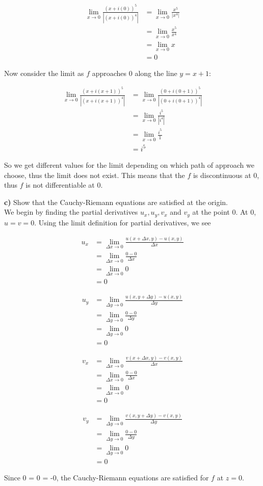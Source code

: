 \documentclass{scrartcl}
\begin{document}
\begin{align*}
\lim_{x\rightarrow0}\frac{(x+i(0))^5}{|(x+i(0))^4|} &= \lim_{x\rightarrow0}\frac{x^5}{|x^4|}\\
  &= \lim_{x\rightarrow0}\frac{x^5}{x^4}\\
  &= \lim_{x\rightarrow0}x\\
  &= 0
\end{align*}

Now consider the limit as $f$ approaches $0$ along the line $y=x+1$:

\begin{align*}
  \lim_{x\rightarrow0}\frac{(x+i(x+1))^5}{|(x+i(x+1))^4|} &= \lim_{x\rightarrow0}\frac{(0+i(0+1))^5}{|(0+i(0+1))^4|}\\
  &= \lim_{x\rightarrow0}\frac{i^5}{|i^4|}\\
  &= \lim_{x\rightarrow0}\frac{i^5}{1}\\
  &= i^5
\end{align*}

So we get different values for the limit depending on which path of approach we choose, thus the limit does not exist. This means that the $f$ is discontinuous at 0, thus $f$ is not differentiable at 0.\pagebreak

\textbf{   c)} Show that the Cauchy-Riemann equations are satisfied at the origin.\\

We begin by finding the partial derivatives $u_x, u_y, v_x$ and $v_y$ at the point 0. At 0, $u = v = 0$. Using the limit definition for partial derivatives, we see

\begin{align*}
  u_x &= \lim_{\Delta x\rightarrow0}\frac{u(x+\Delta x,y) - u(x,y)}{\Delta x}\\
  &= \lim_{\Delta x\rightarrow0}\frac{0 - 0}{\Delta x}\\
  &= \lim_{\Delta x\rightarrow0}0\\
  &= 0
\end{align*}

\begin{align*}
  u_y &= \lim_{\Delta y\rightarrow0}\frac{u(x,y+\Delta y) - u(x,y)}{\Delta y}\\
  &= \lim_{\Delta y\rightarrow0}\frac{0 - 0}{\Delta y}\\
  &= \lim_{\Delta y\rightarrow0}0\\
  &= 0
\end{align*}

\begin{align*}
  v_x &= \lim_{\Delta x\rightarrow0}\frac{v(x+\Delta x,y) - v(x,y)}{\Delta x}\\
  &= \lim_{\Delta x\rightarrow0}\frac{0 - 0}{\Delta x}\\
  &= \lim_{\Delta x\rightarrow0}0\\
  &= 0
\end{align*}

\begin{align*}
 v_y &= \lim_{\Delta y\rightarrow0}\frac{v(x,y+\Delta y) - v(x,y)}{\Delta y}\\
  &= \lim_{\Delta y\rightarrow0}\frac{0 - 0}{\Delta y}\\
  &= \lim_{\Delta y\rightarrow0}0\\
  &= 0
\end{align*}

Since 0 = 0 = -0, the Cauchy-Riemann equations are satisfied for $f$ at $z=0$.
\end{document}
